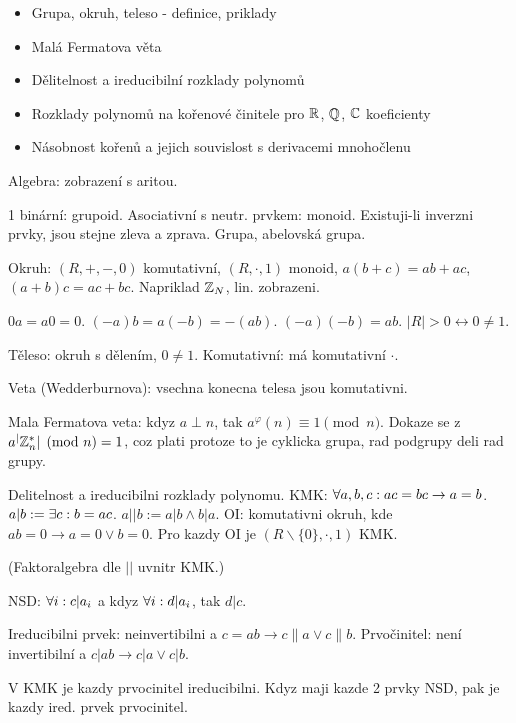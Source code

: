 \begin{understood}
	\begin{itemize}
	\item Grupa, okruh, teleso - definice, priklady
	\item Malá Fermatova věta
	\item Dělitelnost a ireducibilní rozklady polynomů
	\item Rozklady polynomů na kořenové činitele pro $\mathbb{R}$, $\mathbb{Q}$, $\mathbb{C}$
		koeficienty
	\item Násobnost kořenů a jejich souvislost s derivacemi mnohočlenu
	\end{itemize}
\end{understood}

\begin{understood}
Algebra: zobrazení s aritou.
\end{understood}
1 binární: grupoid. Asociativní s neutr. prvkem:
monoid. Existuji-li inverzni prvky, jsou stejne zleva a zprava.
Grupa, abelovská grupa.

\begin{understood}
Okruh: $(R,+,-,0)$ komutativní, $(R,\cdot,1)$ monoid, $a(b+c)=ab+ac$,
$(a+b)c=ac+bc$. Napriklad $\mathbb{Z}_N$, lin. zobrazeni.

$0a = a0 = 0$. $(-a)b=a(-b)=-(ab)$. $(-a)(-b)=ab$. $|R|>0\leftrightarrow 0\neq
1$.
\end{understood}

Těleso: okruh s dělením, $0\neq 1$. Komutativní: má komutativní $\cdot$.

Veta (Wedderburnova): vsechna konecna telesa jsou komutativni.

Mala Fermatova veta: kdyz $a\perp n$, tak $a^\varphi(n)\equiv 1\pmod n$.
Dokaze se z $a^|\mathbb{Z}_n^*|\pmod n=1$, coz plati protoze to je cyklicka grupa,
rad podgrupy deli rad grupy.

Delitelnost a ireducibilni rozklady polynomu.
KMK: $\forall a,b,c: ac=bc\rightarrow a=b$. $a|b:=\exists c: b=ac$. $a||b:=a|b\wedge b|a$.
OI: komutativni okruh, kde $ab=0\rightarrow a=0\vee b=0$.
Pro kazdy OI je $(R\smallsetminus\{0\},\cdot,1)$ KMK.

(Faktoralgebra dle $||$ uvnitr KMK.)

NSD: $\forall i: c|a_i$ a kdyz $\forall i: d|a_i$, tak $d|c$.

Ireducibilni prvek: neinvertibilni a $c=ab\rightarrow c\|a\vee c\|b$.
Prvočinitel: není invertibilní a $c|ab\rightarrow c|a\vee c|b$.

V KMK je kazdy prvocinitel ireducibilni. Kdyz maji kazde 2 prvky NSD,
pak je kazdy ired. prvek prvocinitel.

